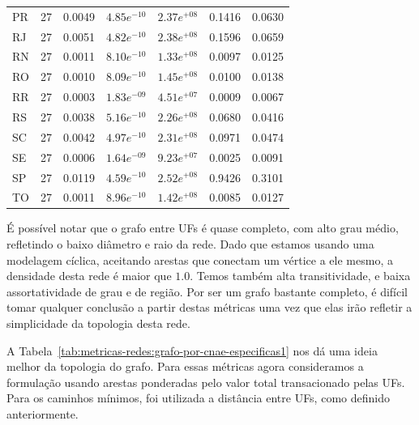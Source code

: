 \begin{table}[htb]
\begin{tabular}{l|rrrrrr}
    PR & 27 & 0.0049 & $4.85e^{-10}$ & $2.37e^{+08}$ & 0.1416 & 0.0630 \\
    RJ & 27 & 0.0051 & $4.82e^{-10}$ & $2.38e^{+08}$ & 0.1596 & 0.0659 \\
    RN & 27 & 0.0011 & $8.10e^{-10}$ & $1.33e^{+08}$ & 0.0097 & 0.0125 \\
    RO & 27 & 0.0010 & $8.09e^{-10}$ & $1.45e^{+08}$ & 0.0100 & 0.0138 \\
    RR & 27 & 0.0003 & $1.83e^{-09}$ & $4.51e^{+07}$ & 0.0009 & 0.0067 \\
    RS & 27 & 0.0038 & $5.16e^{-10}$ & $2.26e^{+08}$ & 0.0680 & 0.0416 \\
    SC & 27 & 0.0042 & $4.97e^{-10}$ & $2.31e^{+08}$ & 0.0971 & 0.0474 \\
    SE & 27 & 0.0006 & $1.64e^{-09}$ & $9.23e^{+07}$ & 0.0025 & 0.0091 \\
    SP & 27 & 0.0119 & $4.59e^{-10}$ & $2.52e^{+08}$ & 0.9426 & 0.3101 \\
    TO & 27 & 0.0011 & $8.96e^{-10}$ & $1.42e^{+08}$ & 0.0085 & 0.0127 \\
    \bottomrule
    \end{tabular}
\fdadospesquisa
\end{table}

É possível notar que o grafo entre UFs é quase completo, com alto grau médio, refletindo o baixo diâmetro e raio da rede. Dado que estamos usando uma modelagem cíclica, aceitando arestas que conectam um vértice a ele mesmo, a densidade desta rede é maior que $1.0$. Temos também alta transitividade, e baixa assortatividade de grau e de região. Por ser um grafo bastante completo, é difícil tomar qualquer conclusão a partir destas métricas uma vez que elas irão refletir a simplicidade da topologia desta rede.

A Tabela~\ref{tab:metricas-redes:grafo-por-cnae-especificas1} nos dá uma ideia melhor da topologia do grafo. Para essas métricas agora consideramos a formulação usando arestas ponderadas pelo valor total transacionado pelas UFs. Para os caminhos mínimos, foi utilizada a distância entre UFs, como definido anteriormente.

